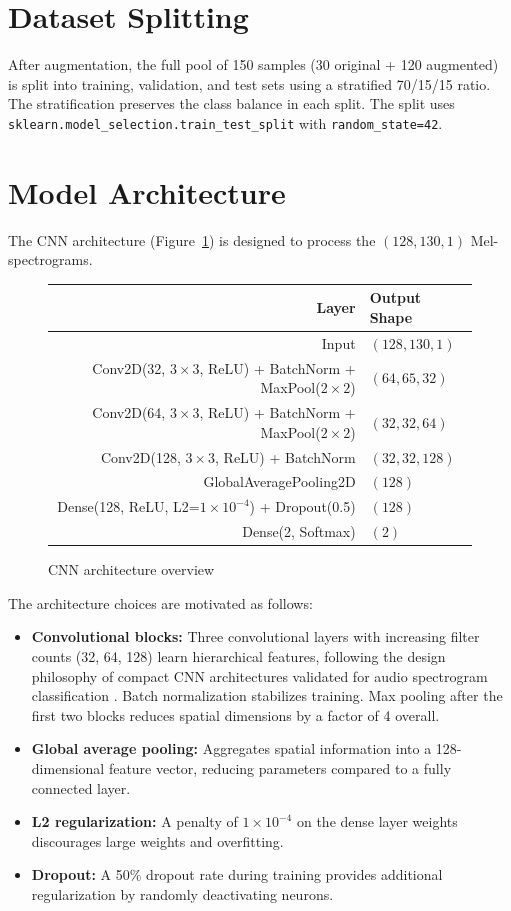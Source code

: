 \documentclass[12pt,a4paper,oneside]{report}
\begin{document}
\section{Dataset Splitting}

After augmentation, the full pool of 150 samples (30 original + 120 augmented) is split into training, validation, and test sets using a stratified 70/15/15 ratio. The stratification preserves the class balance in each split. The split uses \texttt{sklearn.model\_selection.train\_test\_split} with \texttt{random\_state=42}.

\section{Model Architecture}

The CNN architecture (Figure~\ref{fig:architecture}) is designed to process the \((128, 130, 1)\) Mel-spectrograms.

\begin{figure}[H]
\centering
\begin{tabular}{rl}
\textbf{Layer} & \textbf{Output Shape} \\
\hline
Input & \((128, 130, 1)\) \\
Conv2D(32, \(3\times3\), ReLU) + BatchNorm + MaxPool(\(2\times2\)) & \((64, 65, 32)\) \\
Conv2D(64, \(3\times3\), ReLU) + BatchNorm + MaxPool(\(2\times2\)) & \((32, 32, 64)\) \\
Conv2D(128, \(3\times3\), ReLU) + BatchNorm & \((32, 32, 128)\) \\
GlobalAveragePooling2D & \((128)\) \\
Dense(128, ReLU, L2=\(1\times10^{-4}\)) + Dropout(0.5) & \((128)\) \\
Dense(2, Softmax) & \((2)\) \\
\end{tabular}
\caption{CNN architecture overview}
\label{fig:architecture}
\end{figure}

The architecture choices are motivated as follows:
\begin{itemize}
    \item \textbf{Convolutional blocks:} Three convolutional layers with increasing filter counts (32, 64, 128) learn hierarchical features, following the design philosophy of compact CNN architectures validated for audio spectrogram classification \cite{sbcnn2016,zhang2019}. Batch normalization stabilizes training. Max pooling after the first two blocks reduces spatial dimensions by a factor of 4 overall.
    \item \textbf{Global average pooling:} Aggregates spatial information into a 128-dimensional feature vector, reducing parameters compared to a fully connected layer.
    \item \textbf{L2 regularization:} A penalty of \(1 \times 10^{-4}\) on the dense layer weights discourages large weights and overfitting.
    \item \textbf{Dropout:} A 50\% dropout rate during training provides additional regularization by randomly deactivating neurons.
\end{itemize}
\end{document}
